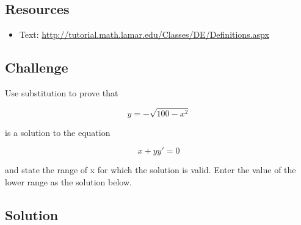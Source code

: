 \subsection*{Resources}
\begin{itemize}
    \item Text: \url{http://tutorial.math.lamar.edu/Classes/DE/Definitions.aspx}
\end{itemize}

\subsection*{Challenge}

Use substitution to prove that

\begin{equation}
    y = -\sqrt{100-x^2}
\end{equation}

is a solution to the equation

\begin{equation}
    x + y y' = 0
\end{equation}

and state the range of x for which the solution is valid. Enter the value of the lower range as the solution below.

\subsection*{Solution}
